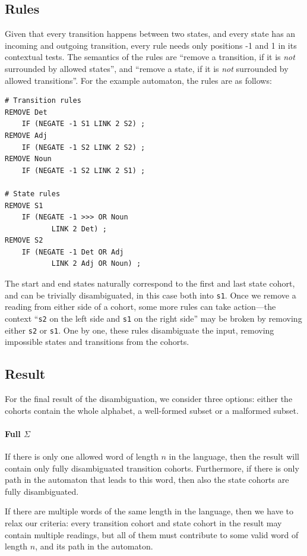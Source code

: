 \documentclass[11pt]{article}
\def\t#1{\texttt{#1}}
\begin{document}
\subsection{Rules}
Given that every transition happens between two states, and every state 
has an incoming and outgoing transition, every rule needs only
positions -1 and 1 in its contextual tests. 
The semantics of the rules are ``remove a transition, if it is 
\emph{not} surrounded by allowed states'',
and ``remove a state, if it is \emph{not} surrounded by allowed transitions''.
For the example automaton, the rules are as follows:

\begin{verbatim}
# Transition rules
REMOVE Det  
    IF (NEGATE -1 S1 LINK 2 S2) ;
REMOVE Adj
    IF (NEGATE -1 S2 LINK 2 S2) ;
REMOVE Noun 
    IF (NEGATE -1 S2 LINK 2 S1) ;

# State rules
REMOVE S1
    IF (NEGATE -1 >>> OR Noun
           LINK 2 Det) ;
REMOVE S2
    IF (NEGATE -1 Det OR Adj 
           LINK 2 Adj OR Noun) ;
\end{verbatim}

The start and end states naturally correspond to the first and last
state cohort, and can be trivially disambiguated, in this case both into \t{s1}.
Once we remove a reading from either side of a cohort, some more rules can take
action---the context ``\t{s2} on the left side and \t{s1} on the right side''
may be broken by removing either \t{s2} or \t{s1}. 
One by one, these rules disambiguate the input, removing impossible
states and transitions from the cohorts.

\subsection{Result}

For the final result of the disambiguation, we consider three options:
either the cohorts contain the whole alphabet, a well-formed subset
or a malformed subset.

\paragraph{Full $\Sigma$}
If there is only one allowed word of length $n$ in the language,
then the result will contain only fully disambiguated transition
cohorts.
Furthermore, if there is only path in the automaton that leads
to this word, then also the state cohorts are fully disambiguated.

If there are multiple words of the same length in the language, then
we have to relax our criteria: every transition cohort and state
cohort in the result may contain multiple readings, but all of them
must contribute to some valid word of length $n$, and its path in the
automaton. 
\end{document}
